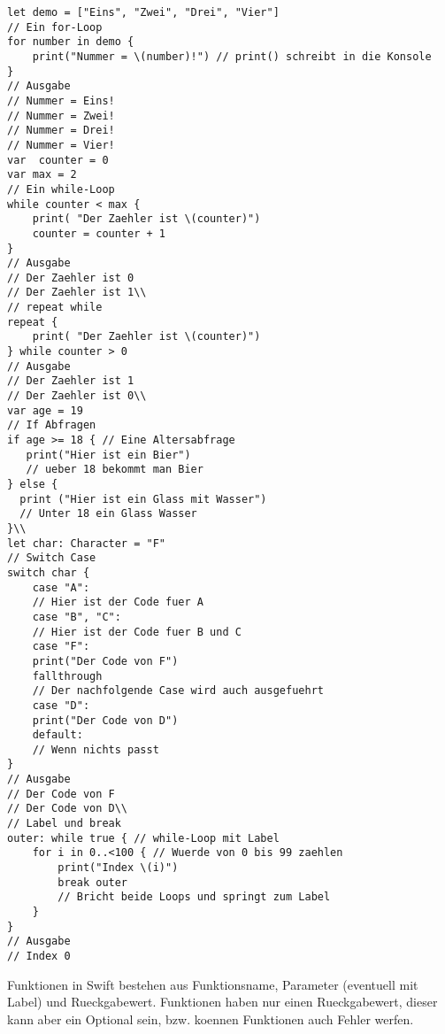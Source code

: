 \begin{lstlisting}
let demo = ["Eins", "Zwei", "Drei", "Vier"]
// Ein for-Loop
for number in demo {
	print("Nummer = \(number)!") // print() schreibt in die Konsole
} 
// Ausgabe
// Nummer = Eins!
// Nummer = Zwei!
// Nummer = Drei!
// Nummer = Vier!
var  counter = 0
var max = 2
// Ein while-Loop
while counter < max {
	print( "Der Zaehler ist \(counter)")
	counter = counter + 1
} 
// Ausgabe
// Der Zaehler ist 0
// Der Zaehler ist 1\\
// repeat while
repeat {
	print( "Der Zaehler ist \(counter)")
} while counter > 0 
// Ausgabe
// Der Zaehler ist 1
// Der Zaehler ist 0\\
var age = 19
// If Abfragen
if age >= 18 { // Eine Altersabfrage
   print("Hier ist ein Bier") 
   // ueber 18 bekommt man Bier
} else {
  print ("Hier ist ein Glass mit Wasser") 
  // Unter 18 ein Glass Wasser
}\\
let char: Character = "F"
// Switch Case
switch char {
    case "A":
	// Hier ist der Code fuer A
    case "B", "C":
	// Hier ist der Code fuer B und C
    case "F":
	print("Der Code von F")
	fallthrough 
	// Der nachfolgende Case wird auch ausgefuehrt
    case "D":
	print("Der Code von D")
    default:
	// Wenn nichts passt
} 
// Ausgabe
// Der Code von F
// Der Code von D\\
// Label und break
outer: while true { // while-Loop mit Label
	for i in 0..<100 { // Wuerde von 0 bis 99 zaehlen
		print("Index \(i)")
		break outer 
		// Bricht beide Loops und springt zum Label
	}
} 
// Ausgabe
// Index 0
\end{lstlisting} 
Funktionen in Swift bestehen aus Funktionsname, Parameter (eventuell mit Label) und Rueckgabewert. Funktionen haben nur einen Rueckgabewert, dieser kann aber ein Optional sein, bzw. koennen Funktionen auch Fehler werfen.
